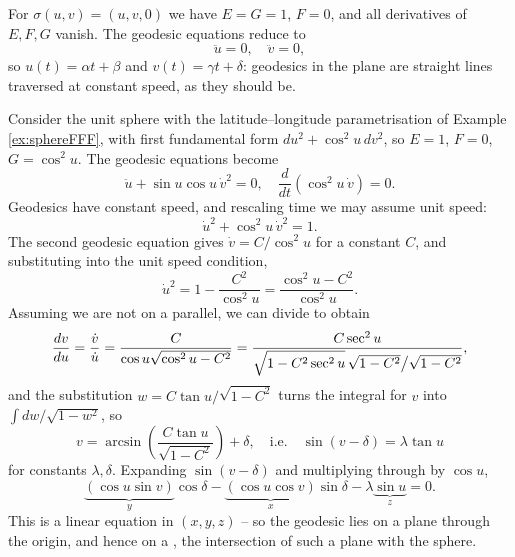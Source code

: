 \documentclass[a4paper]{scrartcl}
\begin{document}
\begin{example}
    For $\sigma(u, v) = (u, v, 0)$ we have $E = G = 1$, $F = 0$, and all derivatives of $E, F, G$ vanish. The geodesic equations reduce to
    $$
    \ddot u = 0, \quad \ddot v = 0,
    $$
    so $u(t) = \alpha t + \beta$ and $v(t) = \gamma t + \delta$: geodesics in the plane are straight lines traversed at constant speed, as they should be.
\end{example}

\begin{example}\label{ex:spheregeodesics}
    Consider the unit sphere with the latitude--longitude parametrisation of Example \ref{ex:sphereFFF}, with first fundamental form $du^2 + \cos^2 u \, dv^2$, so $E = 1$, $F = 0$, $G = \cos^2 u$. The geodesic equations become
    $$
    \ddot u + \sin u \cos u \, \dot v^2 = 0, \quad \frac{d}{dt}\left(\cos^2 u \, \dot v\right) = 0.
    $$
    Geodesics have constant speed, and rescaling time we may assume unit speed:
    $$
    \dot u^2 + \cos^2 u \, \dot v^2 = 1.
    $$
    The second geodesic equation gives $\dot v = C/\cos^2 u$ for a constant $C$, and substituting into the unit speed condition,
    $$
    \dot u^2 = 1 - \frac{C^2}{\cos^2 u} = \frac{\cos^2 u - C^2}{\cos^2 u}.
    $$
    Assuming we are not on a parallel, we can divide to obtain
    $$
    \frac{dv}{du} = \frac{\dot v}{\dot u} = \frac{C}{\cos u \sqrt{\cos^2 u - C^2}} = \frac{C \sec^2 u}{\sqrt{1 - C^2\sec^2 u \vphantom{\big(}}\,\sqrt{1 - C^2}\big/\sqrt{1 - C^2}},
    $$
    and the substitution $w = C \tan u / \sqrt{1 - C^2}$ turns the integral for $v$ into $\int dw/\sqrt{1 - w^2}$, so
    $$
    v = \arcsin\left(\frac{C \tan u}{\sqrt{1 - C^2}}\right) + \delta, \quad \text{i.e.} \quad \sin(v - \delta) = \lambda \tan u
    $$
    for constants $\lambda, \delta$. Expanding $\sin(v - \delta)$ and multiplying through by $\cos u$,
    $$
    \underbrace{(\cos u \sin v)}_{y} \cos\delta - \underbrace{(\cos u \cos v)}_{x}\sin \delta - \lambda \underbrace{\sin u}_{z} = 0.
    $$
    This is a linear equation in $(x, y, z)$ -- so the geodesic lies on a plane through the origin, and hence on a , the intersection of such a plane with the sphere.
    \begin{center}
\end{center}
\end{example}
\end{document}
